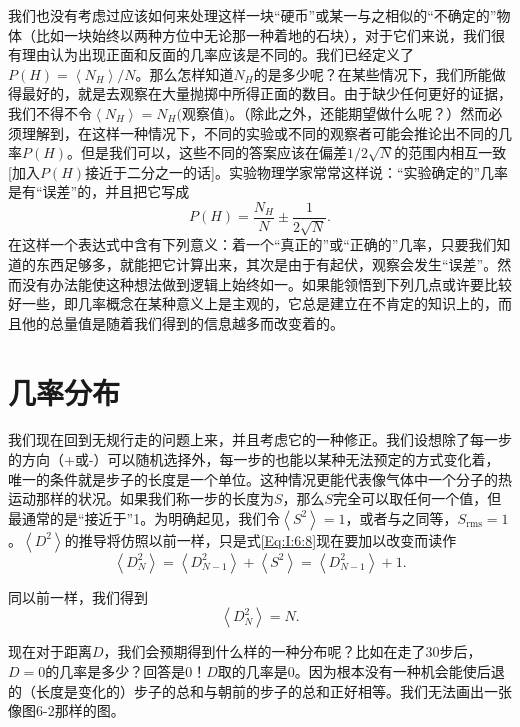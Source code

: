 \documentclass[12pt,oneside]{book}
\begin{document}
我们也没有考虑过应该如何来处理这样一块“硬币”或某一与之相似的“不确定的”物体（比如一块始终以两种方位中无论那一种着地的石块），对于它们来说，我们很有理由认为出现正面和反面的几率应该是不同的。我们已经定义了$P(H)=\left < N_H \right >/N$。那么怎样知道$N_H$的是多少呢？在某些情况下，我们所能做得最好的，就是去观察在大量抛掷中所得正面的数目。由于缺少任何更好的证据，我们不得不令$\left < N_H \right > = N_H\textrm{(观察值)}$。（除此之外，还能期望做什么呢？）然而必须理解到，在这样一种情况下，不同的实验或不同的观察者可能会推论出不同的几率$P(H)$。但是我们可以，这些不同的答案应该在偏差$1/2\sqrt{N}$的范围内相互一致[加入$P(H)$接近于二分之一的话]。实验物理学家常常这样说：“实验确定的”几率是有“误差”的，并且把它写成
\begin{equation}
\label{Eq:I:6:14}
P(H)=\frac{N_H}{N}\pm\frac{1}{2\sqrt{N}}.
\end{equation}
在这样一个表达式中含有下列意义：着一个“真正的”或“正确的”几率，只要我们知道的东西足够多，就能把它计算出来，其次是由于有起伏，观察会发生“误差”。然而没有办法能使这种想法做到逻辑上始终如一。如果能领悟到下列几点或许要比较好一些，即几率概念在某种意义上是主观的，它总是建立在不肯定的知识上的，而且他的总量值是随着我们得到的信息越多而改变着的。


\section{几率分布}
我们现在回到无规行走的问题上来，并且考虑它的一种修正。我们设想除了每一步的方向（+或-）可以随机选择外，每一步的也能以某种无法预定的方式变化着，唯一的条件就是步子的长度是一个单位。这种情况更能代表像气体中一个分子的热运动那样的状况。如果我们称一步的长度为$S$，那么$S$完全可以取任何一个值，但最通常的是“接近于”1。为明确起见，我们令$\left < S^2 \right > = 1$，或者与之同等，$S_{\text{rms}}=1$。$\left < D^2 \right > $的推导将仿照以前一样，只是式\eqref{Eq:I:6:8}现在要加以改变而读作
\begin{equation}
\label{Eq:I:6:15}
\left < D_N^2 \right >=\left <D_{N-1}^2\right >+\left <S^2\right >=\left <D_{N-1}^2\right >+1.
\end{equation}

同以前一样，我们得到
\begin{equation}
\label{Eq:I:6:16}
\left <D_N^2\right > =N.
\end{equation}

现在对于距离$D$，我们会预期得到什么样的一种分布呢？比如在走了30步后，$D=0$的几率是多少？回答是$0$！$D$取的几率是0。因为根本没有一种机会能使后退的（长度是变化的）步子的总和与朝前的步子的总和正好相等。我们无法画出一张像图6-2那样的图。
\end{document}
